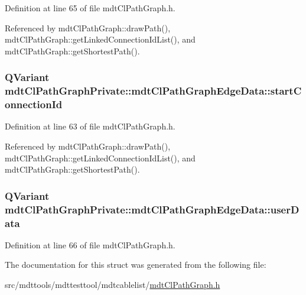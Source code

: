Definition at line 65 of file mdt\-Cl\-Path\-Graph.\-h.



Referenced by mdt\-Cl\-Path\-Graph\-::draw\-Path(), mdt\-Cl\-Path\-Graph\-::get\-Linked\-Connection\-Id\-List(), and mdt\-Cl\-Path\-Graph\-::get\-Shortest\-Path().

\hypertarget{structmdt_cl_path_graph_private_1_1mdt_cl_path_graph_edge_data_a4d17d73e0bbc09b541b91a9ca1cad8da}{
\subsubsection[{start\-Connection\-Id}]{\setlength{\rightskip}{0pt plus 5cm}Q\-Variant mdt\-Cl\-Path\-Graph\-Private\-::mdt\-Cl\-Path\-Graph\-Edge\-Data\-::start\-Connection\-Id}}\label{structmdt_cl_path_graph_private_1_1mdt_cl_path_graph_edge_data_a4d17d73e0bbc09b541b91a9ca1cad8da}


Definition at line 63 of file mdt\-Cl\-Path\-Graph.\-h.



Referenced by mdt\-Cl\-Path\-Graph\-::draw\-Path(), mdt\-Cl\-Path\-Graph\-::get\-Linked\-Connection\-Id\-List(), and mdt\-Cl\-Path\-Graph\-::get\-Shortest\-Path().

\hypertarget{structmdt_cl_path_graph_private_1_1mdt_cl_path_graph_edge_data_a64c472d1739bbf6deed62f2e96d01f55}{
\subsubsection[{user\-Data}]{\setlength{\rightskip}{0pt plus 5cm}Q\-Variant mdt\-Cl\-Path\-Graph\-Private\-::mdt\-Cl\-Path\-Graph\-Edge\-Data\-::user\-Data}}\label{structmdt_cl_path_graph_private_1_1mdt_cl_path_graph_edge_data_a64c472d1739bbf6deed62f2e96d01f55}


Definition at line 66 of file mdt\-Cl\-Path\-Graph.\-h.



The documentation for this struct was generated from the following file\-:\begin{DoxyCompactItemize}
\item 
src/mdttools/mdttesttool/mdtcablelist/\hyperlink{mdt_cl_path_graph_8h}{mdt\-Cl\-Path\-Graph.\-h}\end{DoxyCompactItemize}
